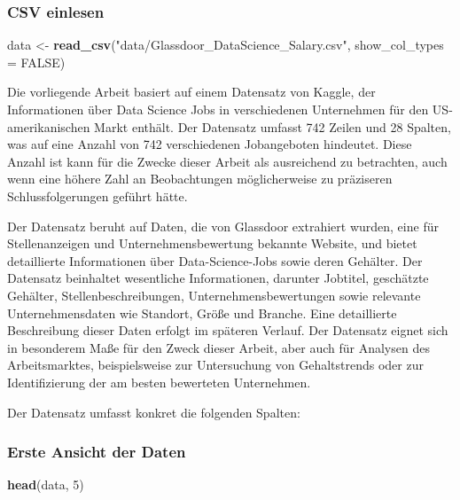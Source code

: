 \documentclass[
]{article}
\newenvironment{Shaded}{\begin{snugshade}}{\end{snugshade}}
\newcommand{\AttributeTok}[1]{\textcolor[rgb]{0.13,0.29,0.53}{#1}}
\newcommand{\ConstantTok}[1]{\textcolor[rgb]{0.56,0.35,0.01}{#1}}
\newcommand{\DecValTok}[1]{\textcolor[rgb]{0.00,0.00,0.81}{#1}}
\newcommand{\FunctionTok}[1]{\textcolor[rgb]{0.13,0.29,0.53}{\textbf{#1}}}
\newcommand{\NormalTok}[1]{#1}
\newcommand{\OtherTok}[1]{\textcolor[rgb]{0.56,0.35,0.01}{#1}}
\newcommand{\StringTok}[1]{\textcolor[rgb]{0.31,0.60,0.02}{#1}}
\begin{document}
\subsubsection{CSV einlesen}\label{csv-einlesen}

\begin{Shaded}
\begin{Highlighting}[]
\NormalTok{data }\OtherTok{\textless{}{-}} \FunctionTok{read\_csv}\NormalTok{(}\StringTok{"data/Glassdoor\_DataScience\_Salary.csv"}\NormalTok{, }\AttributeTok{show\_col\_types =} \ConstantTok{FALSE}\NormalTok{)}
\end{Highlighting}
\end{Shaded}

Die vorliegende Arbeit basiert auf einem Datensatz von Kaggle, der
Informationen über Data Science Jobs in verschiedenen Unternehmen für
den US-amerikanischen Markt enthält. Der Datensatz umfasst 742 Zeilen
und 28 Spalten, was auf eine Anzahl von 742 verschiedenen Jobangeboten
hindeutet. Diese Anzahl ist kann für die Zwecke dieser Arbeit als
ausreichend zu betrachten, auch wenn eine höhere Zahl an Beobachtungen
möglicherweise zu präziseren Schlussfolgerungen geführt hätte.

Der Datensatz beruht auf Daten, die von Glassdoor extrahiert wurden,
eine für Stellenanzeigen und Unternehmensbewertung bekannte Website, und
bietet detaillierte Informationen über Data-Science-Jobs sowie deren
Gehälter. Der Datensatz beinhaltet wesentliche Informationen, darunter
Jobtitel, geschätzte Gehälter, Stellenbeschreibungen,
Unternehmensbewertungen sowie relevante Unternehmensdaten wie Standort,
Größe und Branche. Eine detaillierte Beschreibung dieser Daten erfolgt
im späteren Verlauf. Der Datensatz eignet sich in besonderem Maße für
den Zweck dieser Arbeit, aber auch für Analysen des Arbeitsmarktes,
beispielsweise zur Untersuchung von Gehaltstrends oder zur
Identifizierung der am besten bewerteten Unternehmen.

Der Datensatz umfasst konkret die folgenden Spalten:

\subsubsection{Erste Ansicht der Daten}\label{erste-ansicht-der-daten}

\begin{Shaded}
\begin{Highlighting}[]
\FunctionTok{head}\NormalTok{(data, }\DecValTok{5}\NormalTok{)}
\end{Highlighting}
\end{Shaded}
\end{document}
